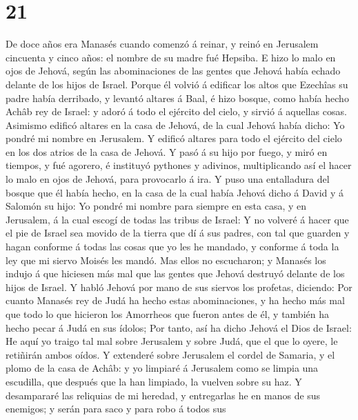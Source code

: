 \hypertarget{section-20}{%
\section{21}\label{section-20}}

 De doce años era Manasés cuando comenzó á reinar, y reinó
en Jerusalem cincuenta y cinco años: el nombre de su madre fué Hepsiba.
 E hizo lo malo en ojos de Jehová, según las abominaciones
de las gentes que Jehová había echado delante de los hijos de Israel.
 Porque él volvió á edificar los altos que Ezechîas su
padre había derribado, y levantó altares á Baal, é hizo bosque, como
había hecho Achâb rey de Israel: y adoró á todo el ejército del cielo, y
sirvió á aquellas cosas.  Asimismo edificó altares en la
casa de Jehová, de la cual Jehová había dicho: Yo pondré mi nombre en
Jerusalem.  Y edificó altares para todo el ejército del
cielo en los dos atrios de la casa de Jehová.  Y pasó á su
hijo por fuego, y miró en tiempos, y fué agorero, é instituyó pythones y
adivinos, multiplicando así el hacer lo malo en ojos de Jehová, para
provocarlo á ira.  Y puso una entalladura del bosque que
él había hecho, en la casa de la cual había Jehová dicho á David y á
Salomón su hijo: Yo pondré mi nombre para siempre en esta casa, y en
Jerusalem, á la cual escogí de todas las tribus de Israel:
 Y no volveré á hacer que el pie de Israel sea movido de
la tierra que dí á sus padres, con tal que guarden y hagan conforme á
todas las cosas que yo les he mandado, y conforme á toda la ley que mi
siervo Moisés les mandó.  Mas ellos no escucharon; y
Manasés los indujo á que hiciesen más mal que las gentes que Jehová
destruyó delante de los hijos de Israel.  Y habló Jehová
por mano de sus siervos los profetas, diciendo:  Por
cuanto Manasés rey de Judá ha hecho estas abominaciones, y ha hecho más
mal que todo lo que hicieron los Amorrheos que fueron antes de él, y
también ha hecho pecar á Judá en sus ídolos;  Por tanto,
así ha dicho Jehová el Dios de Israel: He aquí yo traigo tal mal sobre
Jerusalem y sobre Judá, que el que lo oyere, le retiñirán ambos oídos.
 Y extenderé sobre Jerusalem el cordel de Samaria, y el
plomo de la casa de Achâb: y yo limpiaré á Jerusalem como se limpia una
escudilla, que después que la han limpiado, la vuelven sobre su haz.
 Y desampararé las reliquias de mi heredad, y entregarlas
he en manos de sus enemigos; y serán para saco y para robo á todos sus
